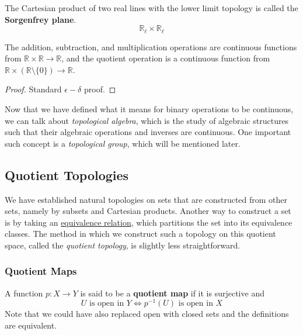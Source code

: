   \begin{example}
    The Cartesian product of two real lines with the lower limit topology is called the \textbf{Sorgenfrey plane}. 
    \begin{equation}
      \mathbb{R}_\ell \times \mathbb{R}_\ell
    \end{equation}
  \end{example}

  \begin{lemma}
    The addition, subtraction, and multiplication operations are continuous functions from $\mathbb{R} \times \mathbb{R} \longrightarrow \mathbb{R}$, and the quotient operation is a continuous function from $\mathbb{R} \times (\mathbb{R} \setminus \{0\}) \longrightarrow \mathbb{R}$. 
  \end{lemma}
  \begin{proof}
    Standard $\epsilon-\delta$ proof. 
  \end{proof}

  Now that we have defined what it means for binary operations to be continuous, we can talk about \textit{topological algebra}, which is the study of algebraic structures such that their algebraic operations and inverses are continuous. One important such concept is a \textit{topological group}, which will be mentioned later. 

\subsection{Quotient Topologies} 

  We have established natural topologies on sets that are constructed from other sets, namely by subsets and Cartesian products. Another way to construct a set is by taking an \hyperref[set-partition]{equivalence relation}, which partitions the set into its equivalence classes. The method in which we construct such a topology on this quotient space, called the \textit{quotient topology}, is slightly less straightforward.  

  \subsubsection{Quotient Maps}

    \begin{definition}
      A function $p: X \rightarrow Y$ is said to be a \textbf{quotient map} if it is surjective and 
      \begin{equation}
        U \text{ is open in } Y \iff p^{-1}(U) \text{ is open in } X
      \end{equation} 
      Note that we could have also replaced open with closed sets and the definitions are equivalent. 
    \end{definition}


